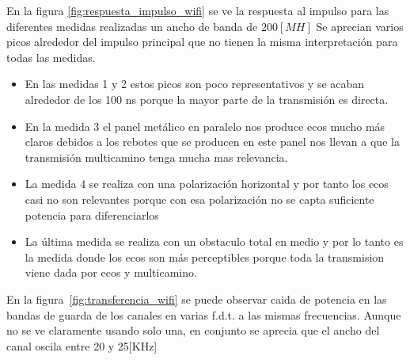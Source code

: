\documentclass[10pt,conference,a4paper]{IEEEtran}
\begin{document}
En la figura \ref{fig:respuesta_impulso_wifi} se ve la respuesta al impulso para las diferentes medidas realizadas  un ancho de banda de $200[MH]$
Se aprecian varios picos alrededor del impulso principal que no tienen la misma interpretación para todas las medidas.
\begin{itemize}
    \item En las medidas 1 y 2 estos picos son poco representativos y se acaban alrededor de los 100 ns porque la mayor parte de la transmisión es directa.
    \item En la medida 3 el panel metálico en paralelo nos produce ecos mucho más claros debidos a los rebotes que se producen en este panel nos llevan a que la transmisión multicamino tenga mucha mas relevancia.
    \item La medida 4 se realiza con una polarización horizontal y por tanto los ecos casi no son relevantes porque con esa polarización no se capta suficiente potencia para diferenciarlos
    \item La última medida se realiza con un obstaculo total en medio y por lo tanto es la medida donde los ecos son más perceptibles porque toda la transmision viene dada por ecos y multicamino.
\end{itemize}

En la figura~\ref{fig:transferencia_wifi} se puede observar caida de potencia en las bandas de guarda de los canales en varias f.d.t. a las mismas frecuencias. Aunque no se ve claramente usando solo una, en conjunto se aprecia que el ancho del canal oscila entre 20 y 25[KHz]
\end{document}
